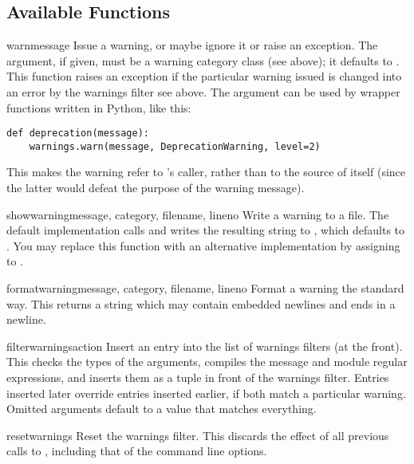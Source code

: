 \subsection{Available Functions}

\begin{funcdesc}{warn}{message}
Issue a warning, or maybe ignore it or raise an exception.  The
 argument, if given, must be a warning category class
(see above); it defaults to .  This function
raises an exception if the particular warning issued is changed
into an error by the warnings filter see above.  The 
argument can be used by wrapper functions written in Python, like
this:

\begin{verbatim}
def deprecation(message):
    warnings.warn(message, DeprecationWarning, level=2)
\end{verbatim}

This makes the warning refer to 's caller,
rather than to the source of  itself (since
the latter would defeat the purpose of the warning message).
\end{funcdesc}

\begin{funcdesc}{showwarning}{message, category, filename,
			     lineno}
Write a warning to a file.  The default implementation calls
 and writes the resulting string to , which
defaults to .  You may replace this function with an
alternative implementation by assigning to
.
\end{funcdesc}

\begin{funcdesc}{formatwarning}{message, category, filename, lineno}
Format a warning the standard way.  This returns a string  which may
contain embedded newlines and ends in a newline.
\end{funcdesc}

\begin{funcdesc}{filterwarnings}{action}
Insert an entry into the list of warnings filters (at the front).
This checks the types of the arguments, compiles the message and
module regular expressions, and inserts them as a tuple in front
of the warnings filter.  Entries inserted later override entries
inserted earlier, if both match a particular warning.  Omitted
arguments default to a value that matches everything.
\end{funcdesc}

\begin{funcdesc}{resetwarnings}{}
Reset the warnings filter.  This discards the effect of all previous
calls to , including that of the 
command line options.
\end{funcdesc}
